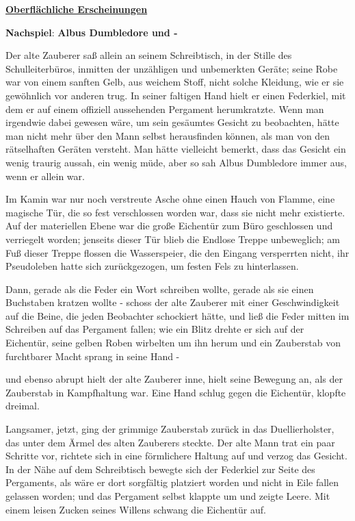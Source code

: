 

\hypertarget{oberfluxe4chliche-erscheinungen}{%

\textbf{\uline{Oberflächliche Erscheinungen}}

\textbf{Nachspiel}: \textbf{Albus Dumbledore und -}

Der alte Zauberer saß allein an seinem Schreibtisch, in der Stille des Schulleiterbüros, inmitten der unzähligen und unbemerkten Geräte; seine Robe war von einem sanften Gelb, aus weichem Stoff, nicht solche Kleidung, wie er sie gewöhnlich vor anderen trug. In seiner faltigen Hand hielt er einen Federkiel, mit dem er auf einem offiziell aussehenden Pergament herumkratzte. Wenn man irgendwie dabei gewesen wäre, um sein gesäumtes Gesicht zu beobachten, hätte man nicht mehr über den Mann selbst herausfinden können, als man von den rätselhaften Geräten versteht. Man hätte vielleicht bemerkt, dass das Gesicht ein wenig traurig aussah, ein wenig müde, aber so sah Albus Dumbledore immer aus, wenn er allein war.

Im Kamin war nur noch verstreute Asche ohne einen Hauch von Flamme, eine magische Tür, die so fest verschlossen worden war, dass sie nicht mehr existierte. Auf der materiellen Ebene war die große Eichentür zum Büro geschlossen und verriegelt worden; jenseits dieser Tür blieb die Endlose Treppe unbeweglich; am Fuß dieser Treppe flossen die Wasserspeier, die den Eingang versperrten nicht, ihr Pseudoleben hatte sich zurückgezogen, um festen Fels zu hinterlassen.

Dann, gerade als die Feder ein Wort schreiben wollte, gerade als sie einen Buchstaben kratzen wollte - schoss der alte Zauberer mit einer Geschwindigkeit auf die Beine, die jeden Beobachter schockiert hätte, und ließ die Feder mitten im Schreiben auf das Pergament fallen; wie ein Blitz drehte er sich auf der Eichentür, seine gelben Roben wirbelten um ihn herum und ein Zauberstab von furchtbarer Macht sprang in seine Hand -

und ebenso abrupt hielt der alte Zauberer inne, hielt seine Bewegung an, als der Zauberstab in Kampfhaltung war. Eine Hand schlug gegen die Eichentür, klopfte dreimal.

Langsamer, jetzt, ging der grimmige Zauberstab zurück in das Duellierholster, das unter dem Ärmel des alten Zauberers steckte. Der alte Mann trat ein paar Schritte vor, richtete sich in eine förmlichere Haltung auf und verzog das Gesicht. In der Nähe auf dem Schreibtisch bewegte sich der Federkiel zur Seite des Pergaments, als wäre er dort sorgfältig platziert worden und nicht in Eile fallen gelassen worden; und das Pergament selbst klappte um und zeigte Leere. Mit einem leisen Zucken seines Willens schwang die Eichentür auf.

}
